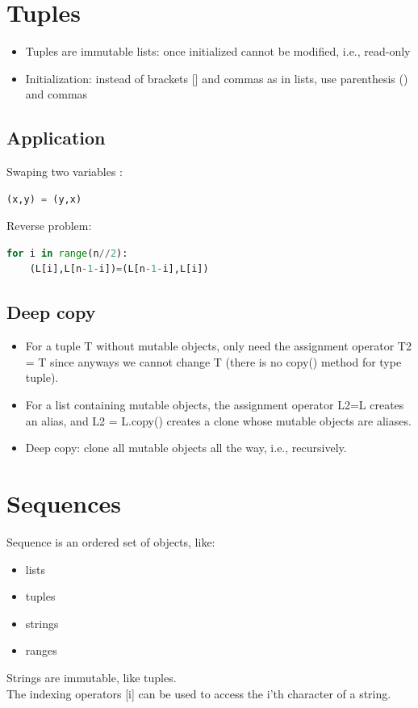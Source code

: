 \documentclass[12pt,oneside]{book}
\begin{document}
\section{Tuples}
\begin{itemize}
	\item Tuples are immutable lists: once initialized cannot be modified, i.e., read-only
	\item Initialization: instead of brackets [] and commas as in lists, use parenthesis () and commas
\end{itemize}
\subsection{Application}
Swaping two variables :
\begin{lstlisting}[language=python]
(x,y) = (y,x)
\end{lstlisting}
Reverse problem:
\begin{lstlisting}[language=python]
for i in range(n//2):
	(L[i],L[n-1-i])=(L[n-1-i],L[i])
\end{lstlisting}
\subsection{Deep copy}
\begin{itemize}
	\item For a tuple T without mutable objects, only need the assignment operator T2 = T since anyways we cannot change T (there is no copy() method for type tuple).
	\item For a list containing mutable objects, the assignment operator L2=L creates an alias, and L2 = L.copy() creates a clone whose mutable objects are aliases.
	\item Deep copy: clone all mutable objects all the way, i.e., recursively.
\end{itemize}
\section{Sequences}
Sequence is an ordered set of objects, like:
\begin{itemize}
	\item lists
	\item tuples
	\item strings
	\item ranges
\end{itemize}
Strings are immutable, like tuples.\\
The indexing operators [i] can be used to access the i'th character of a string.
\end{document}
